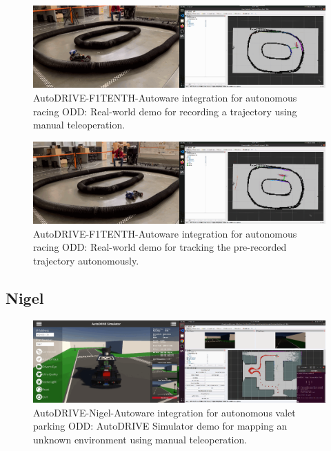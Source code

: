 \begin{figure}[H]
    \centering
    \includegraphics[width=\linewidth]{Figures/fig17.png}
    \caption{AutoDRIVE-F1TENTH-Autoware integration for autonomous racing ODD: Real-world demo for recording a trajectory using manual teleoperation.}
    \label{fig: figure17}
\end{figure}

\begin{figure}[H]
    \centering
    \includegraphics[width=\linewidth]{Figures/fig18.png}
    \caption{AutoDRIVE-F1TENTH-Autoware integration for autonomous racing ODD: Real-world demo for tracking the pre-recorded trajectory autonomously.}
    \label{fig: figure18}
\end{figure}

\hypertarget{Nigel}{%
\subsection{Nigel}\label{Nigel}}

\begin{figure}[H]
    \centering
    \includegraphics[width=\linewidth]{Figures/fig19.png}
    \caption{AutoDRIVE-Nigel-Autoware integration for autonomous valet parking ODD: AutoDRIVE Simulator demo for mapping an unknown environment using manual teleoperation.}
    \label{fig: figure19}
\end{figure}

